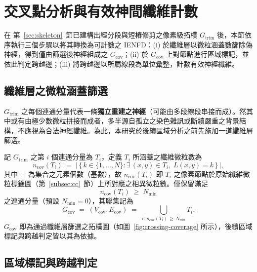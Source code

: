 \section{交叉點分析與有效神間纖維計數}
\label{sec:crossing}

在 第~\ref{sec:skeleton}~節已建構出經分段與短樁修剪之像素級拓樸 $G_{\text{trim}}$ 後，本節依序執行三個步驟以將其轉換為可計數之 IENFD：(i) 於纖維層以微粒涵蓋數篩除偽神經，得到僅由篩選後神經組成之 $G_{\text{cov}}$；(ii) 於 $G_{\text{cov}}$ 上對節點進行區域標記，並依此判定跨越邊；(iii) 將跨越邊以所屬線段為單位彙整，計數有效神經纖維。

\subsection{纖維層之微粒涵蓋篩選}
\label{subsec:coverage-filter}

$G_{\text{trim}}$ 之每個連通分量代表一條\textbf{獨立重建之神經}（可能由多段線段串接而成）。然其中或有由極少數微粒拼接而成者，多半源自孤立之染色雜訊或斷續嚴重之背景結構，不應視為合法神經纖維。為此，本研究於後續區域分析之前先施加一道纖維層篩選。

記 $G_{\text{trim}}$ 之第 $i$ 個連通分量為 $T_i$，定義 $T_i$ 所涵蓋之纖維微粒數為
\begin{equation}
  n_{\text{cov}}(T_i) \;=\; \bigl|\,\{\, k \in \{1, \ldots, N\} : \exists\, (x, y) \in T_i,\; L(x, y) = k \,\}\,\bigr|,
  \label{eq:particle-cov}
\end{equation}
其中 $|\cdot|$ 為集合之元素個數（基數），故 $n_{\text{cov}}(T_i)$ 即 $T_i$ 之像素節點於原始纖維微粒標籤圖（第~\ref{subsec:cc}~節）上所對應之相異微粒數。僅保留滿足
\begin{equation}
  n_{\text{cov}}(T_i) \;\ge\; N_{\min}
  \label{eq:particle-min}
\end{equation}
之連通分量（預設 $N_{\min} = 0$），其聯集記為
\begin{equation*}
  G_{\text{cov}} \;=\; (V_{\text{cov}}, E_{\text{cov}}) \;=\; \bigcup_{i:\, n_{\text{cov}}(T_i) \,\ge\, N_{\min}} T_i.
\end{equation*}
$G_{\text{cov}}$ 即為通過纖維層篩選之拓樸圖（如圖~\ref{fig:crossing-coverage} 所示），後續區域標記與跨越判定皆以其為依據。

\subsection{區域標記與跨越判定}
\label{subsec:region}

